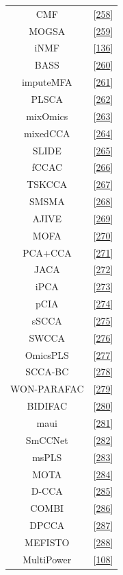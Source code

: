 \documentclass[
  12pt,
  a4paper,
  twoside,
  openright]{book}
\begin{document}
\begin{longtable}[]{@{}cc@{}}
CMF & {[}\protect\hyperlink{ref-klami2014}{258}{]} \\
MOGSA & {[}\protect\hyperlink{ref-meng2018}{259}{]} \\
iNMF & {[}\protect\hyperlink{ref-yang2016}{136}{]} \\
BASS & {[}\protect\hyperlink{ref-zhao2015}{260}{]} \\
imputeMFA & {[}\protect\hyperlink{ref-voillet2016}{261}{]} \\
PLSCA & {[}\protect\hyperlink{ref-beaton2016}{262}{]} \\
mixOmics & {[}\protect\hyperlink{ref-singh2019}{263}{]} \\
mixedCCA & {[}\protect\hyperlink{ref-yoon2019}{264}{]} \\
SLIDE & {[}\protect\hyperlink{ref-gaynanova2017}{265}{]} \\
fCCAC & {[}\protect\hyperlink{ref-madrigal2017}{266}{]} \\
TSKCCA & {[}\protect\hyperlink{ref-yoshida2017}{267}{]} \\
SMSMA & {[}\protect\hyperlink{ref-kawaguchi2017}{268}{]} \\
AJIVE & {[}\protect\hyperlink{ref-feng2018}{269}{]} \\
MOFA & {[}\protect\hyperlink{ref-argelaguet2020}{270}{]} \\
PCA+CCA & {[}\protect\hyperlink{ref-brown2018}{271}{]} \\
JACA & {[}\protect\hyperlink{ref-zhang2020}{272}{]} \\
iPCA & {[}\protect\hyperlink{ref-tang2021}{273}{]} \\
pCIA & {[}\protect\hyperlink{ref-min2019}{274}{]} \\
sSCCA & {[}\protect\hyperlink{ref-safo2018}{275}{]} \\
SWCCA & {[}\protect\hyperlink{ref-min2017}{276}{]} \\
OmicsPLS & {[}\protect\hyperlink{ref-bouhaddani2018}{277}{]} \\
SCCA-BC & {[}\protect\hyperlink{ref-pimentel2018}{278}{]} \\
WON-PARAFAC & {[}\protect\hyperlink{ref-kim2019}{279}{]} \\
BIDIFAC & {[}\protect\hyperlink{ref-lock2020}{280}{]} \\
maui & {[}\protect\hyperlink{ref-ronen2019}{281}{]} \\
SmCCNet & {[}\protect\hyperlink{ref-shi2019}{282}{]} \\
msPLS & {[}\protect\hyperlink{ref-csala2020}{283}{]} \\
MOTA & {[}\protect\hyperlink{ref-fan2020}{284}{]} \\
D-CCA & {[}\protect\hyperlink{ref-shu2020}{285}{]} \\
COMBI & {[}\protect\hyperlink{ref-hawinkel2020}{286}{]} \\
DPCCA & {[}\protect\hyperlink{ref-gundersen2020}{287}{]} \\
MEFISTO & {[}\protect\hyperlink{ref-velten2020}{288}{]} \\
MultiPower & {[}\protect\hyperlink{ref-tarazona2020}{108}{]} \\
\bottomrule
\end{longtable}
\end{document}
